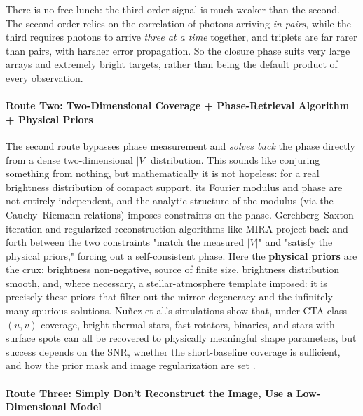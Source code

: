 There is no free lunch: the third-order signal is much weaker than the second. The second order relies on the correlation of photons arriving \emph{in pairs}, while the third requires photons to arrive \emph{three at a time} together, and triplets are far rarer than pairs, with harsher error propagation. So the closure phase suits very large arrays and extremely bright targets, rather than being the default product of every observation.

\paragraph{Route Two: Two-Dimensional Coverage + Phase-Retrieval Algorithm + Physical Priors}
\label{sec:e11-phase-retrieval}

The second route bypasses phase measurement and \emph{solves back} the phase directly from a dense two-dimensional \(|V|\) distribution. This sounds like conjuring something from nothing, but mathematically it is not hopeless: for a real brightness distribution of compact support, its Fourier modulus and phase are not entirely independent, and the analytic structure of the modulus (via the Cauchy--Riemann relations) imposes constraints on the phase. Gerchberg--Saxton iteration \citep{1966JOSA...56..441G} and regularized reconstruction algorithms like MIRA project back and forth between the two constraints "match the measured \(|V|\)" and "satisfy the physical priors," forcing out a self-consistent phase. Here the \textbf{physical priors} are the crux: brightness non-negative, source of finite size, brightness distribution smooth, and, where necessary, a stellar-atmosphere template imposed: it is precisely these priors that filter out the mirror degeneracy and the infinitely many spurious solutions. Nuñez et al.'s simulations show that, under CTA-class \((u,v)\) coverage, bright thermal stars, fast rotators, binaries, and stars with surface spots can all be recovered to physically meaningful shape parameters, but success depends on the SNR, whether the short-baseline coverage is sufficient, and how the prior mask and image regularization are set \citep{2012MNRAS.419..172N,2012MNRAS.424.1006N,2014SPIE.9146E..0ZD}.

\paragraph{Route Three: Simply Don't Reconstruct the Image, Use a Low-Dimensional Model}
\label{sec:e11-low-dim}

